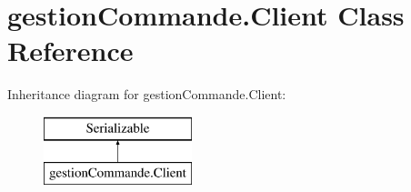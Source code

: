 \hypertarget{classgestion_commande_1_1_client}{\section{gestion\-Commande.\-Client Class Reference}
\label{classgestion_commande_1_1_client}
}
Inheritance diagram for gestion\-Commande.\-Client\-:\begin{figure}[H]
\begin{center}
\leavevmode
\includegraphics[height=2.000000cm]{classgestion_commande_1_1_client}
\end{center}
\end{figure}
